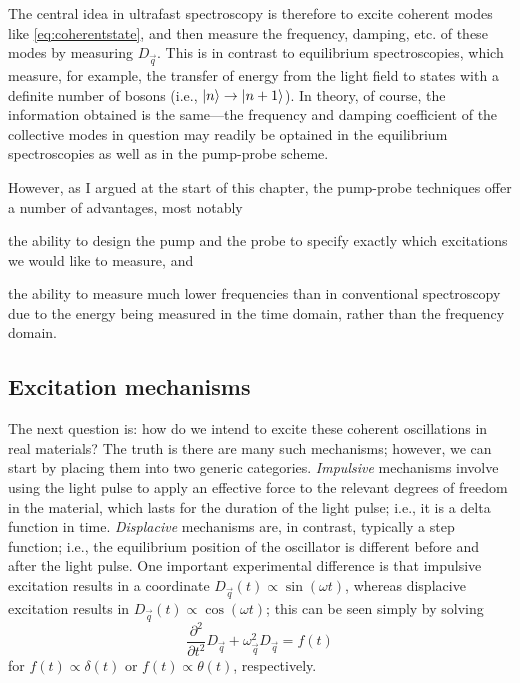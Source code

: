 The central idea in ultrafast spectroscopy is therefore to excite coherent modes like \cref{eq:coherentstate}, and then measure the frequency, damping, etc. of these modes by measuring $D_{\vec{q}}$.
This is in contrast to equilibrium spectroscopies, which measure, for example, the transfer of energy from the light field to states with a definite number of bosons (i.e., $\ket{n}\rightarrow\ket{n+1}$).
In theory, of course, the information obtained is the same---the frequency and damping coefficient of the collective modes in question may readily be optained in the equilibrium spectroscopies as well as in the pump-probe scheme.
\begin{enumerate*}[label=(\roman*)]\item[] However, as I argued at the start of this chapter, the pump-probe techniques offer a number of advantages, most notably \item the ability to design the pump and the probe to specify exactly which excitations we would like to measure, and \item the ability to measure much lower frequencies than in conventional spectroscopy due to the energy being measured in the time domain, rather than the frequency domain.\end{enumerate*}

\subsection{Excitation mechanisms}

The next question is: how do we intend to excite these coherent oscillations in real materials?
The truth is there are many such mechanisms; however, we can start by placing them into two generic categories.
\emph{Impulsive} mechanisms involve using the light pulse to apply an effective force to the relevant degrees of freedom in the material, which lasts for the duration of the light pulse; i.e., it is a delta function in time.
\emph{Displacive} mechanisms are, in contrast, typically a step function; i.e., the equilibrium position of the oscillator is different before and after the light pulse.
One important experimental difference is that impulsive excitation results in a coordinate $D_{\vec{q}}(t)\propto\sin(\omega t)$, whereas displacive excitation results in $D_{\vec{q}}(t)\propto\cos(\omega t)$; this can be seen simply by solving
\begin{equation}\label{eq:Dqequationofmotion}
\frac{\partial^2}{\partial t^2}D_{\vec{q}}+\omega^2_{\vec{q}}D_{\vec{q}} = f(t)
\end{equation}
for $f(t)\propto \delta(t)$ or $f(t)\propto \theta(t)$, respectively.

